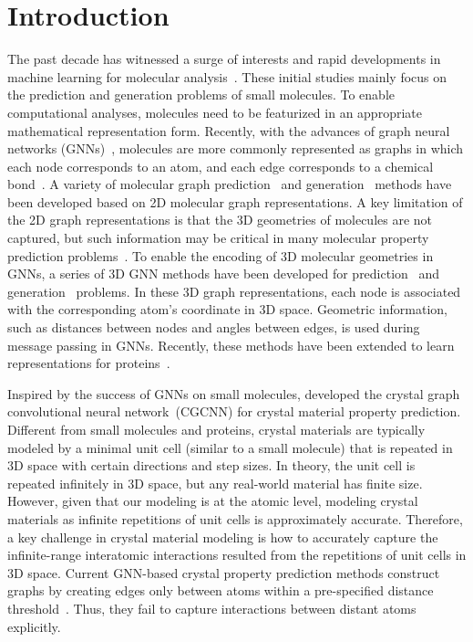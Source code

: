 \documentclass[nohyperref]{article}
\theoremstyle{plain}
\theoremstyle{definition}
\theoremstyle{remark}
\begin{document}
\section{Introduction}

The past decade has witnessed a surge of interests and rapid developments in machine learning for molecular analysis~\citep{duvenaud2015convolutional}. These initial studies mainly focus on the prediction and generation problems of small molecules. To enable computational analyses, molecules need to be featurized in an appropriate mathematical representation form. 
Recently, with the advances of graph neural networks (GNNs)~\citep{gilmer2017neural,battaglia2018relational,gao2021topology,Liu:Protein}, molecules are more commonly represented as graphs in which each node corresponds to an atom, and each edge corresponds to a chemical bond~\citep{stokes2020deep,wang2020advanced}. 
A variety of molecular graph prediction~\citep{stokes2020deep,wang2020advanced} and generation~\citep{shi2019graphaf,jin2018junction,luo2021graphdf} methods have been developed based on 2D molecular graph representations. A key limitation of the 2D graph representations is that the 3D geometries of molecules are not captured, but such information may be critical in many molecular property prediction problems~\citep{hu2021ogb}. To enable the encoding of 3D molecular geometries in GNNs, a series of 3D GNN methods have been developed for prediction~\citep{schutt2017schnet,gasteiger2019directional,liu2022spherical,wang2022comenet} and generation~\citep{liu2022generating,luo2021autoregressive,hoogeboom2022equivariant} problems.
In these 3D graph representations, each node is associated with the corresponding atom's coordinate in 3D space. Geometric information, such as distances between nodes and angles between edges, is used during message passing in GNNs. 
Recently, these methods have been extended to learn representations for proteins~\citep{jing2020learning,wang2023learning}.

Inspired by the success of GNNs on small molecules, 
\cite{xie2018crystal} developed the crystal graph convolutional neural network~(CGCNN) for crystal material property prediction. Different from small molecules and proteins, crystal materials are typically modeled by a minimal unit cell (similar to a small molecule) that is repeated in 3D space with certain directions and step sizes. In theory, the unit cell is repeated infinitely in 3D space, but any real-world material has finite size. However, given that our modeling is at the atomic level, modeling crystal materials as infinite repetitions of unit cells is approximately accurate. Therefore, a key challenge in crystal material modeling is how to accurately capture the infinite-range interatomic interactions resulted from the repetitions of unit cells in 3D space. Current GNN-based crystal property prediction methods construct graphs by creating edges only between atoms within a pre-specified distance threshold~\citep{xie2018crystal,MegNet,GATGNN,CyAtt,ALIGNN}. Thus, they fail to capture interactions between distant atoms explicitly. 
\end{document}
